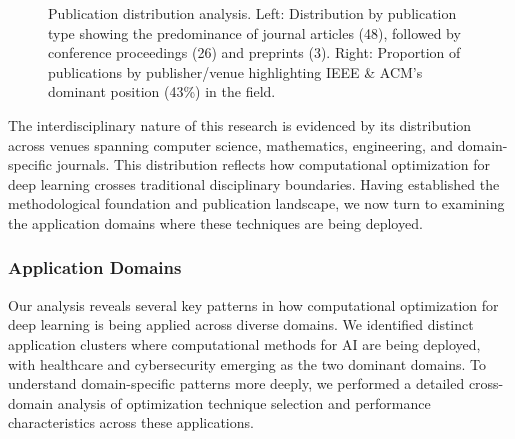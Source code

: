 \begin{figure}[h]
\centering
{}
\hspace{0.05\textwidth}
\caption{Publication distribution analysis. Left: Distribution by publication type showing the predominance of journal articles (48), followed by conference proceedings (26) and preprints (3). Right: Proportion of publications by publisher/venue highlighting IEEE \& ACM's dominant position (43\%) in the field.}
\label{fig:publication_distribution}
\end{figure}

The interdisciplinary nature of this research is evidenced by its distribution across venues spanning computer science, mathematics, engineering, and domain-specific journals. This distribution reflects how computational optimization for deep learning crosses traditional disciplinary boundaries. Having established the methodological foundation and publication landscape, we now turn to examining the application domains where these techniques are being deployed.

\subsubsection{Application Domains}
Our analysis reveals several key patterns in how computational optimization for deep learning is being applied across diverse domains. We identified distinct application clusters where computational methods for AI are being deployed, with healthcare and cybersecurity emerging as the two dominant domains. To understand domain-specific patterns more deeply, we performed a detailed cross-domain analysis of optimization technique selection and performance characteristics across these applications.

